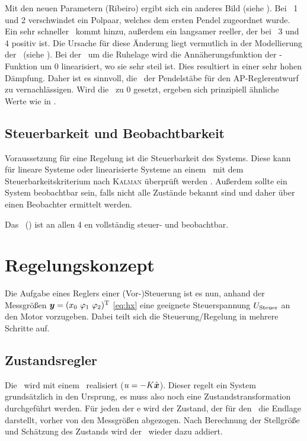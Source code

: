 Mit den neuen Parametern (Ribeiro) ergibt sich ein anderes Bild (siehe ).
Bei \ap\ 1 und 2 verschwindet ein Polpaar, welches dem ersten Pendel zugeordnet wurde. Ein sehr schneller \ew\ kommt hinzu, außerdem ein langsamer reeller, der bei \ap\ 3 und 4 positiv ist. 
Die Ursache für diese Änderung liegt vermutlich in der Modellierung der \crb\ (siehe ). Bei der \lin\ um die Ruhelage wird die Annäherungsfunktion der -Funktion um 0 linearisiert, wo sie sehr steil ist. Dies resultiert in einer sehr hohen Dämpfung. Daher ist es sinnvoll, die \crb\ der Pendelstäbe für den AP-Reglerentwurf zu vernachlässigen.
Wird die \crb\ zu 0 gesetzt, ergeben sich prinzipiell ähnliche Werte wie in .


\subsection{Steuerbarkeit und Beobachtbarkeit}

Voraussetzung für eine Regelung ist die Steuerbarkeit des Systems. Diese kann für lineare Systeme oder linearisierte Systeme an einem \ap\ mit dem Steuerbarkeitskriterium nach \textsc{Kalman} überprüft werden \cite{AdamyRT2}. Außerdem sollte ein System beobachtbar sein, falls nicht alle Zustände bekannt sind und daher über einen Beobachter ermittelt werden.

Das \spds\ (\bss) ist an allen 4 \ap en vollständig steuer- und beobachtbar.


\section{Regelungskonzept}

Die Aufgabe eines Reglers \bzw einer (Vor-)Steuerung ist es nun, anhand der Messgrößen $\vey=(\xo\ \phe\ \phz)^{\transp}$ \eqref{eq:hx} eine geeignete Steuerspannung $U_{\mathrm{Steuer}}$ an den Motor vorzugeben. Dabei teilt sich die Steuerung/Regelung in mehrere Schritte auf. 


\subsection{Zustandsregler}

Die \aprg\ wird mit einem \zsr\ realisiert ($u=-K \hat{\boldsymbol{x}}$). 
Dieser regelt ein System grundsätzlich in den Ursprung, es muss also noch eine Zustandstransformation durchgeführt werden. 
Für jeden der \ap e  wird der Zustand, der für den \zsr\ die Endlage darstellt, vorher von den Messgrößen abgezogen. 
Nach Berechnung der Stellgröße und Schätzung des Zustands wird der \ap\ wieder dazu addiert.

